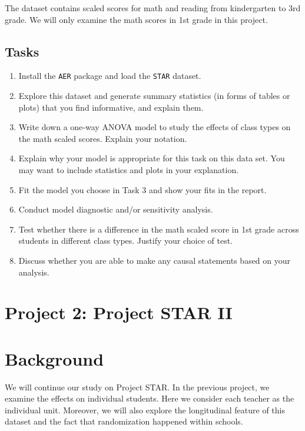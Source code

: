 \documentclass[12pt,]{book}
\providecommand{\tightlist}{%
  \setlength{\itemsep}{0pt}\setlength{\parskip}{0pt}}
\begin{document}
The dataset contains scaled scores for math and reading from
kindergarten to 3rd grade. We will only examine the math scores in 1st
grade in this project.

\subsection{Tasks}\label{tasks}

\begin{enumerate}
\def\labelenumi{\arabic{enumi}.}
\tightlist
\item
  Install the \texttt{AER} package and load the \texttt{STAR} dataset.\\
\item
  Explore this dataset and generate summary statistics (in forms of
  tables or plots) that you find informative, and explain them.\\
\item
  Write down a one-way ANOVA model to study the effects of class types
  on the math scaled scores. Explain your notation.
\item
  Explain why your model is appropriate for this task on this data set.
  You may want to include statistics and plots in your explanation.
\item
  Fit the model you choose in Task 3 and show your fits in the report.
\item
  Conduct model diagnostic and/or sensitivity analysis.
\item
  Test whether there is a difference in the math scaled score in 1st
  grade across students in different class types. Justify your choice of
  test.
\item
  Discuss whether you are able to make any causal statements based on
  your analysis.
\end{enumerate}

\section{Project 2: Project STAR II}\label{project-2-project-star-ii}

\section{Background}\label{background-1}

We will continue our study on Project STAR. In the previous project, we
examine the effects on individual students. Here we consider each
teacher as the individual unit. Moreover, we will also explore the
longitudinal feature of this dataset and the fact that randomization
happened within schools.
\end{document}
